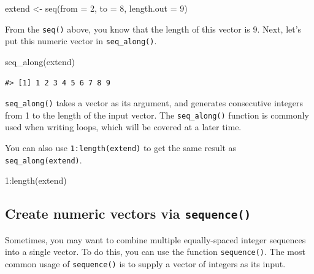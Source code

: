 \documentclass[
]{book}
\newenvironment{Shaded}{\begin{snugshade}}{\end{snugshade}}
\newcommand{\AttributeTok}[1]{\textcolor[rgb]{0.77,0.63,0.00}{#1}}
\newcommand{\DecValTok}[1]{\textcolor[rgb]{0.00,0.00,0.81}{#1}}
\newcommand{\FunctionTok}[1]{\textcolor[rgb]{0.00,0.00,0.00}{#1}}
\newcommand{\NormalTok}[1]{#1}
\newcommand{\OtherTok}[1]{\textcolor[rgb]{0.56,0.35,0.01}{#1}}
\newcommand{\SpecialCharTok}[1]{\textcolor[rgb]{0.00,0.00,0.00}{#1}}
\newenvironment{infobox}[1]
  {
  \begin{itemize}
  \renewcommand{\labelitemi}{
    \raisebox{-.7\height}[0pt][0pt]{
      {\setkeys{Gin}{width=3em,keepaspectratio}
        \texttt{[image: pics/\#1]}}
    }
  }
  \setlength{\fboxsep}{1em}
  \begin{blackbox}
  \item
  }
  {
  \end{blackbox}
  \end{itemize}
  }
\newenvironment{blackbox}{
  \definecolor{shadecolor}{rgb}{0, 0, 0}  %
  \color{white}
  \begin{shaded}}
 {\end{shaded}}
\begin{document}
\begin{Shaded}
\begin{Highlighting}[]
\NormalTok{extend }\OtherTok{\textless{}{-}} \FunctionTok{seq}\NormalTok{(}\AttributeTok{from =} \DecValTok{2}\NormalTok{, }\AttributeTok{to =} \DecValTok{8}\NormalTok{, }\AttributeTok{length.out =} \DecValTok{9}\NormalTok{) }
\end{Highlighting}
\end{Shaded}

From the \texttt{seq()} above, you know that the length of this vector is 9. Next, let's put this numeric vector in \texttt{seq\_along()}.

\begin{Shaded}
\begin{Highlighting}[]
\FunctionTok{seq\_along}\NormalTok{(extend)}
\end{Highlighting}
\end{Shaded}

\begin{verbatim}
#> [1] 1 2 3 4 5 6 7 8 9
\end{verbatim}

\texttt{seq\_along()} takes a vector as its argument, and generates consecutive integers from 1 to the length of the input vector. The \texttt{seq\_along()} function is commonly used when writing loops, which will be covered at a later time.

\begin{infobox}{caution}

You can also use \texttt{1:length(extend)} to get the same result as \texttt{seq\_along(extend)}.

\begin{Shaded}
\begin{Highlighting}[]
\DecValTok{1}\SpecialCharTok{:}\FunctionTok{length}\NormalTok{(extend)}
\end{Highlighting}
\end{Shaded}

\end{infobox}

\hypertarget{create-numeric-vectors-via-sequence}{%
\subsection{\texorpdfstring{Create numeric vectors via \texttt{sequence()}}{Create numeric vectors via sequence()}}\label{create-numeric-vectors-via-sequence}}

Sometimes, you may want to combine multiple equally-spaced integer sequences into a single vector. To do this, you can use the function \texttt{sequence()}. The most common usage of \texttt{sequence()} is to supply a vector of integers as its input.
\end{document}
